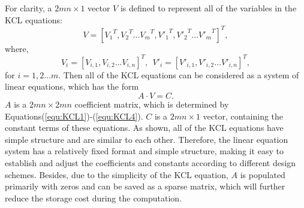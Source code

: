 For clarity, a ${2mn\times 1}$ vector ${V}$ is defined to represent all of the variables in the KCL equations:
\begin{equation}\label{equ:V1}
{V}=[{V_1}^T,{V_2}^T...{V_m}^T,{V'_1}^T,{V'_2}^T...{V'_m}^T]^T,
\end{equation}
where,
\begin{equation}\label{equ:V2}
{V_i} = [V_{i,1},V_{i,2}...V_{i,n}]^T,~~{V'_i} = [V'_{i,1},V'_{i,2}...V'_{i,n}]^T,
\end{equation}
for $i=1,2...m$. Then all of the KCL equations can be considered as a
system of linear equations, which has the form
\begin{equation}\label{equ:matrix}
A\cdot V = C.
\end{equation}
$A$ is a ${2mn\times{2mn}}$ coefficient matrix, which is determined by
Equations(\ref{equ:KCL1})-(\ref{equ:KCL4}). $C$ is a ${2mn\times{1}}$
vector, containing the constant terms of these equations. As shown, all of
the KCL equations have simple structure and are similar to each
other. Therefore, the linear equation system has a relatively fixed format
and simple structure, making it easy to establish and adjust the
coefficients and constants according to different design schemes. Besides,
due to the simplicity of the KCL equation, $A$ is populated primarily with
zeros and can be saved as a sparse matrix, which will further reduce the
storage cost during the computation.



